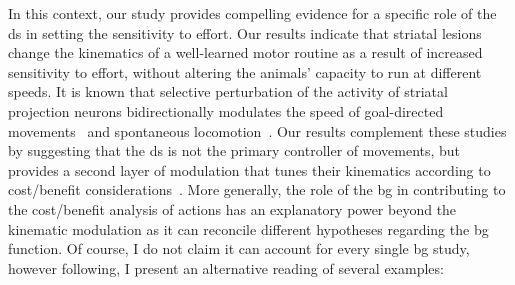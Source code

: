 In this context, our study provides compelling evidence for a specific role of the \gls{ds} in setting the sensitivity to effort.
Our results indicate that striatal lesions change the kinematics of a well-learned motor routine as a result of increased sensitivity to effort, without altering the animals' capacity to run at different speeds.
It is known that selective perturbation of the activity of striatal projection neurons bidirectionally modulates the speed of goal-directed movements~\cite{Yttri2016Nature} and spontaneous locomotion~\cite{Kravitz2010Nature}.
Our results complement these studies by suggesting that the \gls{ds} is not the primary controller of movements, but provides a second layer of modulation that tunes their kinematics according to cost/benefit considerations~\cite{Berke2018NN,Beeler2012Fron}.
More generally, the role of the \gls{bg} in contributing to the cost/benefit analysis of actions has an explanatory power beyond the kinematic modulation as it can reconcile different hypotheses regarding the \gls{bg} function.
Of course, I do not claim it can account for every single \gls{bg} study, however following, I present an alternative reading of several examples:

